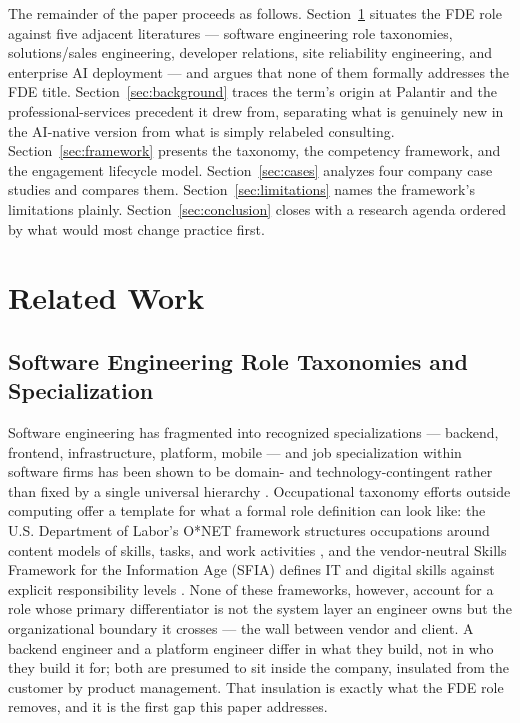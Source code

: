 \documentclass[journal]{IEEEtran}
\begin{document}
The remainder of the paper proceeds as follows. Section~\ref{sec:related} situates the FDE role against five adjacent literatures --- software engineering role taxonomies, solutions/sales engineering, developer relations, site reliability engineering, and enterprise AI deployment --- and argues that none of them formally addresses the FDE title. Section~\ref{sec:background} traces the term's origin at Palantir and the professional-services precedent it drew from, separating what is genuinely new in the AI-native version from what is simply relabeled consulting. Section~\ref{sec:framework} presents the taxonomy, the competency framework, and the engagement lifecycle model. Section~\ref{sec:cases} analyzes four company case studies and compares them. Section~\ref{sec:limitations} names the framework's limitations plainly. Section~\ref{sec:conclusion} closes with a research agenda ordered by what would most change practice first.

\section{Related Work}
\label{sec:related}

\subsection{Software Engineering Role Taxonomies and Specialization}

Software engineering has fragmented into recognized specializations --- backend, frontend, infrastructure, platform, mobile --- and job specialization within software firms has been shown to be domain- and technology-contingent rather than fixed by a single universal hierarchy \cite{magalhaes2022jobspecialization}. Occupational taxonomy efforts outside computing offer a template for what a formal role definition can look like: the U.S. Department of Labor's O*NET framework structures occupations around content models of skills, tasks, and work activities \cite{onet2024about}, and the vendor-neutral Skills Framework for the Information Age (SFIA) defines IT and digital skills against explicit responsibility levels \cite{sfia2024framework}. None of these frameworks, however, account for a role whose primary differentiator is not the system layer an engineer owns but the organizational boundary it crosses --- the wall between vendor and client. A backend engineer and a platform engineer differ in what they build, not in who they build it for; both are presumed to sit inside the company, insulated from the customer by product management. That insulation is exactly what the FDE role removes, and it is the first gap this paper addresses.
\end{document}
